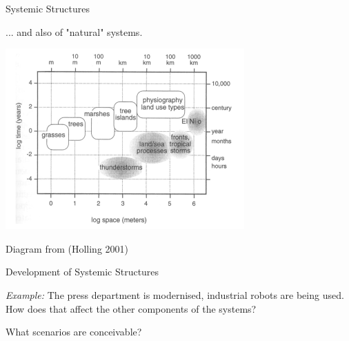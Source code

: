 \documentclass{beamer}
\begin{document}
\begin{frame}{Systemic Structures}

  ... and also of "natural" systems.
  \begin{center}
    \includegraphics[width=.85\textwidth]{Bilder/Holling-3.png}

    Diagram from (Holling 2001)
  \end{center}
\end{frame}

\begin{frame}{Development of Systemic Structures}

  \emph{Example:} The press department is modernised, industrial robots are
  being used.  How does that affect the other components of the systems?

  What scenarios are conceivable?

\end{frame}
\end{document}
